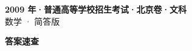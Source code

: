 \documentclass[zihao=-4, a4paper]{ctexart}
\begin{document}
\begin{center}
  {\Large\bfseries 2009 年·普通高等学校招生考试·北京卷·文科}\\[4pt]
  {\large 数学 · 简答版}
\end{center}
\medskip
{}

\clearpage
{}
\begin{center}{\Large\bfseries 答案速查}\end{center}
\medskip

\end{document}
